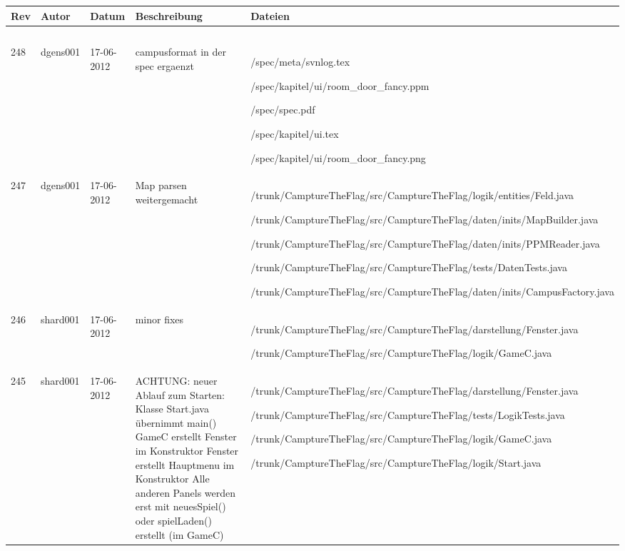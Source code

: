
  \begin{longtable}{l l l p{80px} p{80px}}
	  \textbf{Rev} & \textbf{Autor}  &\textbf{Datum} & \textbf{Beschreibung} & \textbf{Dateien}\\
        
	  \hline
	               &      \          &      \        &          \            &                 \\
	  248 &
		  dgens001
		  &
		  17-06-2012
		  &
		  campusformat in der spec ergaenzt
		  & \strut
		  /spec/meta/svnlog.tex \par /spec/kapitel/ui/room\_door\_fancy.ppm \par /spec/spec.pdf \par /spec/kapitel/ui.tex \par /spec/kapitel/ui/room\_door\_fancy.png \par  \strut \\
	  247 &
		  dgens001
		  &
		  17-06-2012
		  &
		  Map parsen weitergemacht
		  & \strut
		  /trunk/CamptureTheFlag/src/CamptureTheFlag/logik/entities/Feld.java \par /trunk/CamptureTheFlag/src/CamptureTheFlag/daten/inits/MapBuilder.java \par /trunk/CamptureTheFlag/src/CamptureTheFlag/daten/inits/PPMReader.java \par /trunk/CamptureTheFlag/src/CamptureTheFlag/tests/DatenTests.java \par /trunk/CamptureTheFlag/src/CamptureTheFlag/daten/inits/CampusFactory.java \par  \strut \\
	  246 &
		  shard001
		  &
		  17-06-2012
		  &
		  minor fixes
		  & \strut
		  /trunk/CamptureTheFlag/src/CamptureTheFlag/darstellung/Fenster.java \par /trunk/CamptureTheFlag/src/CamptureTheFlag/logik/GameC.java \par  \strut \\
	  245 &
		  shard001
		  &
		  17-06-2012
		  &
		  ACHTUNG:
neuer Ablauf zum Starten:
Klasse Start.java übernimmt main()
GameC erstellt Fenster im Konstruktor
Fenster erstellt Hauptmenu im Konstruktor
Alle anderen Panels werden erst mit neuesSpiel() oder spielLaden() erstellt (im GameC)
		  & \strut
		  /trunk/CamptureTheFlag/src/CamptureTheFlag/darstellung/Fenster.java \par /trunk/CamptureTheFlag/src/CamptureTheFlag/tests/LogikTests.java \par /trunk/CamptureTheFlag/src/CamptureTheFlag/logik/GameC.java \par /trunk/CamptureTheFlag/src/CamptureTheFlag/logik/Start.java \par  \strut \\

\end{longtable}
